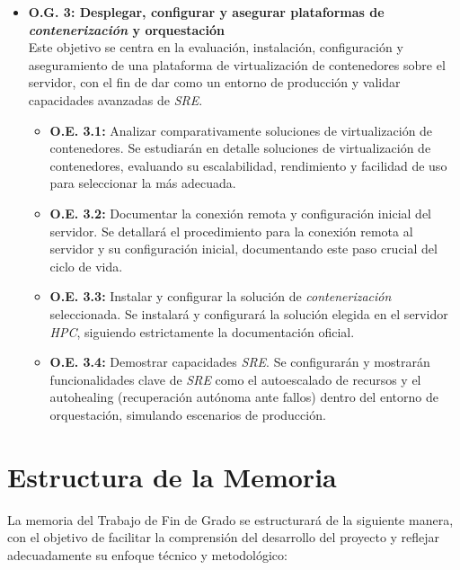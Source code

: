 \begin{itemize}
\begin{itemize}
        \item \textbf{O.E. 2.2:} Evaluar comparativamente el rendimiento de los \textit{LLM}. Se realizarán benchmarks para estudiar los modelos de \textit{LLM} desplegados, observando métricas relevantes para garantizar su eficiencia y demostrar la capacidad de la infraestructura \textit{HPC}.
    \end{itemize}
    \item \textbf{O.G. 3: Desplegar, configurar y asegurar plataformas de \textit{contenerización} y orquestación}\\
    Este objetivo se centra en la evaluación, instalación, configuración y aseguramiento de una plataforma de virtualización de contenedores sobre el servidor, con el fin de dar como un entorno de producción y validar capacidades avanzadas de \textit{SRE}.
    \begin{itemize}
        \item \textbf{O.E. 3.1:} Analizar comparativamente soluciones de virtualización de contenedores. Se estudiarán en detalle soluciones de virtualización de contenedores, evaluando su escalabilidad, rendimiento y facilidad de uso para seleccionar la más adecuada.
        \item \textbf{O.E. 3.2:} Documentar la conexión remota y configuración inicial del servidor. Se detallará el procedimiento para la conexión remota al servidor y su configuración inicial, documentando este paso crucial del ciclo de vida.
        \item \textbf{O.E. 3.3:} Instalar y configurar la solución de \textit{contenerización} seleccionada. Se instalará y configurará la solución elegida en el servidor \textit{HPC}, siguiendo estrictamente la documentación oficial.
        \item \textbf{O.E. 3.4:} Demostrar capacidades \textit{SRE}. Se configurarán y mostrarán funcionalidades clave de \textit{SRE} como el autoescalado de recursos y el autohealing (recuperación autónoma ante fallos) dentro del entorno de orquestación, simulando escenarios de producción.
    \end{itemize}
\end{itemize}

\section{Estructura de la Memoria}
La memoria del Trabajo de Fin de Grado se estructurará de la siguiente manera, con el objetivo de facilitar la comprensión del desarrollo del proyecto y reflejar adecuadamente su enfoque técnico y metodológico:

